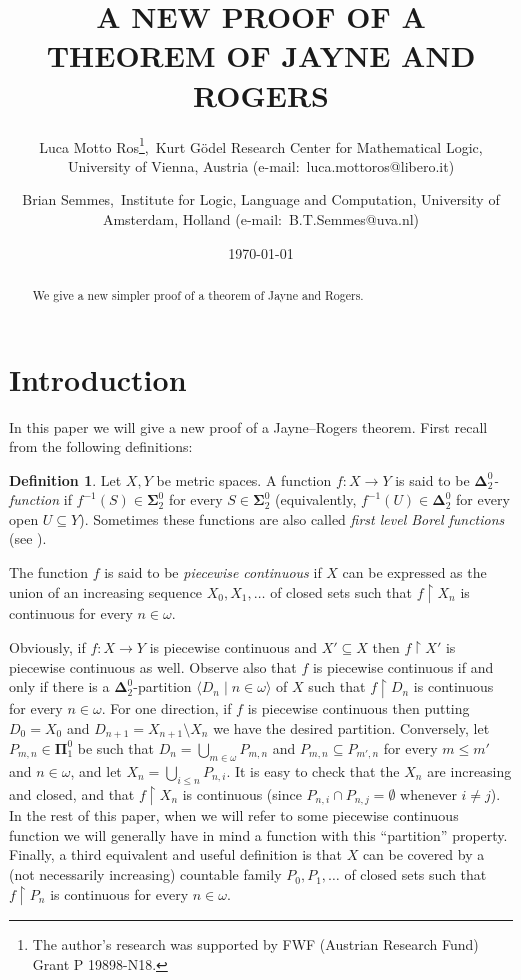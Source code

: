 \documentclass{rae}
\title{A NEW PROOF OF A THEOREM OF JAYNE AND ROGERS}
\author{Luca Motto Ros\thanks{The author's research was supported by FWF (Austrian Research Fund) Grant P 19898-N18.},\
Kurt G\"odel Research Center for Mathematical Logic, University of Vienna, Austria
(e-mail:~luca.mottoros@libero.it)
\and
Brian Semmes,\
Institute for Logic, Language and Computation, University of Amsterdam, Holland
(e-mail:~B.T.Semmes@uva.nl)}
\date{\today}
\newcommand{\bSigma}{\mathbf{\Sigma}}
\newcommand{\bPi}{\mathbf{\Pi}}
\newcommand{\bDelta}{\mathbf{\Delta}}
\newcommand{\restr}[2]{#1 \restriction #2}
\newcommand{\seq}[2]{\langle #1 \mid  #2 \rangle}
\theoremstyle{definition}
\newtheorem{defin}{Definition}
\begin{document}
\maketitle


\begin{abstract}
We give a new simpler proof of a theorem of Jayne and Rogers.
\end{abstract}

\section{Introduction}

In this paper we will give a new proof of a Jayne--Rogers theorem.
First recall from \cite{jaynerogers} the following definitions:

\begin{defin}
  Let $X,Y$ be metric spaces. A function $f \colon X \to Y$ is said to be 
\emph{$\bDelta^0_2$-function} if $f^{-1}(S) \in \bSigma^0_2$ for every 
$S \in \bSigma^0_2$ (equivalently, $f^{-1}(U) \in \bDelta^0_2$ for every 
open $U \subseteq Y$). Sometimes these functions are also called
\emph{first level Borel functions} (see \cite{jaynerogers}).

The function $f$ is said to be \emph{piecewise continuous} if $X$
 can be expressed as the union of an increasing sequence $X_0, X_1,
 \dotsc$ of closed sets such that $\restr{f}{X_n}$ is continuous for
 every $n \in \omega$.
\end{defin}

Obviously, if $f \colon X \to Y$ is piecewise continuous and $X' \subseteq X$ then $\restr{f}{X'}$ is piecewise continuous as well.
Observe also that $f$ is piecewise continuous if and only if there is
 a $\bDelta^0_2$-partition $\seq{D_n}{n \in \omega}$ of $X$
 such that $\restr{f}{D_n}$ is continuous for every $n \in
 \omega$. For one direction, if $f$ is piecewise continuous then putting
$D_0 = X_0$ and
 $D_{n+1} = X_{n+1} \setminus X_n$ we have the desired partition.
 Conversely, let $P_{m,n} \in \bPi^0_1$ be such that $D_n =
 \bigcup_{m \in \omega} P_{m,n}$ and $P_{m,n} \subseteq P_{m',n}$
 for every $m \leq m'$ and $n \in \omega$, and let $X_n =
 \bigcup_{i \leq n} P_{n,i}$. It is easy to check that the $X_n$
 are increasing and closed, and that $\restr{f}{X_n}$ is continuous
 (since $P_{n,i} \cap P_{n,j} = \emptyset$ whenever $i \neq j$). 
 In the rest of this paper, when we will refer to some piecewise
 continuous function we will generally have in mind a function
 with this ``partition'' property. Finally, a third 
equivalent and useful definition is that $X$ can be covered by a (not necessarily increasing) 
countable family  
$P_0, P_1, \dotsc$ of closed sets such that $\restr{f}{P_n}$ is
continuous for every $n \in \omega$.
\end{document}
